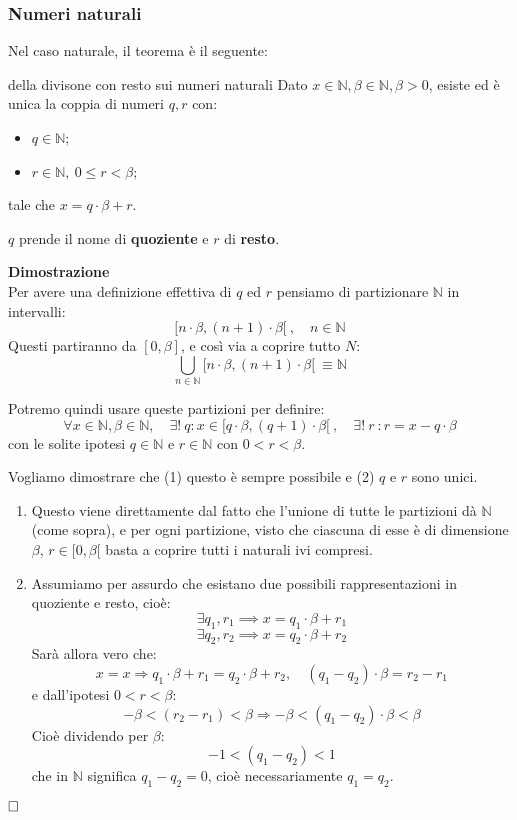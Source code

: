 \documentclass[a4paper,11pt]{article}
\begin{document}
\subsubsection{Numeri naturali}
Nel caso naturale, il teorema è il seguente:
\begin{theorem}{della divisone con resto sui numeri naturali}
	Dato $x \in \mathbb{N}, \beta \in \mathbb{N}, \beta > 0$, esiste ed è unica la coppia di numeri $q,r$ con:
	\begin{itemize}
		\item $q \in \mathbb{N}$;
		\item $r \in \mathbb{N}, \ 0 \leq r < \beta$;
	\end{itemize}
	tale che $x = q \cdot \beta + r$.
\end{theorem}
$q$ prende il nome di \textbf{quoziente} e $r$ di \textbf{resto}.

\par\medskip
\noindent
\textbf{\textsf{Dimostrazione}} \\
Per avere una definizione effettiva di $q$ ed $r$ pensiamo di partizionare  $\mathbb{N}$ in intervalli:
$$
[n \cdot \beta, (n+1) \cdot \beta[ \ , \quad n \in \mathbb{N}
$$
Questi partiranno da $[0, \beta]$, e così via a coprire tutto $N$:
$$
\bigcup_{n \in \mathbb{N}} [n \cdot \beta, (n+1) \cdot \beta[ \ \equiv \mathbb{N}
$$

Potremo quindi usare queste partizioni per definire:
$$ \forall x \in \mathbb{N}, \beta \in \mathbb{N}, \quad \exists ! \ q : x \in [ q \cdot \beta, (q+1) \cdot \beta [ \ , \quad \exists ! \ r \ : r = x - q \cdot \beta $$
con le solite ipotesi $q \in \mathbb{N}$ e $r \in \mathbb{N}$ con $0 < r < \beta$.

Vogliamo dimostrare che (1) questo è sempre possibile e (2) $q$ e $r$ sono unici.
\begin{enumerate}
	\item Questo viene direttamente dal fatto che l'unione di tutte le partizioni dà $\mathbb{N}$ (come sopra), e per ogni partizione, visto che ciascuna di esse è di dimensione $\beta$, $r \in [0, \beta[$ basta a coprire tutti i naturali ivi compresi.
	\item Assumiamo per assurdo che esistano due possibili rappresentazioni in quoziente e resto, cioè:
		$$
		\exists q_1, r_1 \implies x = q_1 \cdot \beta + r_1
		$$
		$$
		\exists q_2, r_2 \implies x = q_2 \cdot \beta + r_2
		$$
		Sarà allora vero che:
		$$
		x = x \Rightarrow  q_1 \cdot \beta + r_1 = 	q_2 \cdot \beta + r_2, \quad (q_1 - q_2) \cdot \beta = r_2 - r_1 $$
		e dall'ipotesi $0 < r < \beta$:
		$$ -\beta < (r_2 - r_1) < \beta \Rightarrow -\beta < (q_1 - q_2) \cdot \beta < \beta $$
		Cioè dividendo per $\beta$:
		$$ -1 < (q_1 - q_2) < 1 $$
		che in $\mathbb{N}$ significa $q_1 - q_2 = 0$, cioè necessariamente $q_1 = q_2$. 
\end{enumerate}
$\hfill\square$
\end{document}
